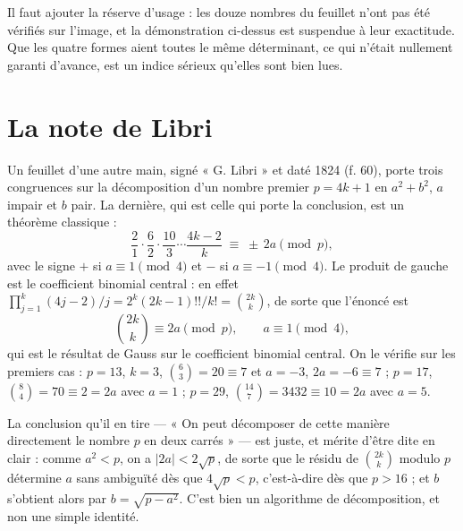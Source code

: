\documentclass[11pt,a4paper]{article}
\begin{document}
Il faut ajouter la réserve d'usage : les douze nombres du feuillet n'ont pas été
vérifiés sur l'image, et la démonstration ci-dessus est suspendue à leur
exactitude. Que les quatre formes aient toutes le même déterminant, ce qui
n'était nullement garanti d'avance, est un indice sérieux qu'elles sont bien
lues.

\section*{La note de Libri}

Un feuillet d'une autre main, signé « G. Libri » et daté 1824 (f. 60), porte
trois congruences sur la décomposition d'un nombre premier $p = 4k+1$ en
$a^2+b^2$, $a$ impair et $b$ pair. La dernière, qui est celle qui porte la
conclusion, est un théorème classique :
\[
  \frac{2}{1}\cdot\frac{6}{2}\cdot\frac{10}{3}\cdots\frac{4k-2}{k}
  \;\equiv\; \pm\,2a \pmod{p},
\]
avec le signe $+$ si $a \equiv 1 \pmod 4$ et $-$ si $a \equiv -1 \pmod 4$. Le
produit de gauche est le coefficient binomial central : en effet
$\prod_{j=1}^{k}(4j-2)/j = 2^k(2k-1)!!/k! = \binom{2k}{k}$, de sorte que
l'énoncé est
\[
  \binom{2k}{k} \equiv 2a \pmod p, \qquad a \equiv 1 \pmod 4 ,
\]
qui est le résultat de Gauss sur le coefficient binomial central. On le
vérifie sur les premiers cas : $p=13$, $k=3$, $\binom63 = 20 \equiv 7$ et
$a = -3$, $2a = -6 \equiv 7$ ; $p=17$, $\binom84 = 70 \equiv 2 = 2a$ avec
$a = 1$ ; $p=29$, $\binom{14}{7} = 3432 \equiv 10 = 2a$ avec $a=5$.

La conclusion qu'il en tire — « On peut décomposer de cette manière
directement le nombre $p$ en deux carrés » — est juste, et mérite d'être dite
en clair : comme $a^2 < p$, on a $|2a| < 2\sqrt{p}$, de sorte que le résidu de
$\binom{2k}{k}$ modulo $p$ détermine $a$ sans ambiguïté dès que
$4\sqrt{p} < p$, c'est-à-dire dès que $p > 16$ ; et $b$ s'obtient alors par
$b = \sqrt{p - a^2}$. C'est bien un algorithme de décomposition, et non une
simple identité.
\end{document}
